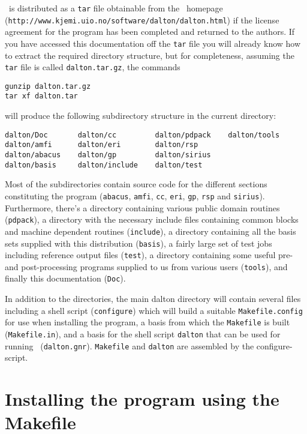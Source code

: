 \dalton\ is distributed as a \verb|tar| file obtainable from
the \dalton\ homepage\\
(\verb|http://www.kjemi.uio.no/software/dalton/dalton.html|) if the
license agreement for the program has been completed and returned to
the authors.  If you have accessed this documentation off the
\verb|tar| file you will
already know how to extract the required directory structure, but
for completeness, assuming the \verb|tar| file is called
\verb|dalton.tar.gz|, the commands
\begin{verbatim}
gunzip dalton.tar.gz
tar xf dalton.tar
\end{verbatim}
will produce the following subdirectory structure in the current
directory:
\begin{verbatim}
dalton/Doc       dalton/cc         dalton/pdpack    dalton/tools
dalton/amfi      dalton/eri        dalton/rsp
dalton/abacus    dalton/gp         dalton/sirius
dalton/basis     dalton/include    dalton/test
\end{verbatim}
Most of the subdirectories contain source code for the different sections
constituting the program (\verb|abacus|, \verb|amfi|, \verb|cc|,
\verb|eri|, \verb|gp|, \verb|rsp| and \verb|sirius|). Furthermore,
there's a directory containing
various public domain routines (\verb|pdpack|), a directory with the
necessary include files containing common blocks and
machine dependent routines (\verb|include|), a directory containing
all the basis sets supplied with this distribution (\verb|basis|), a
fairly large set of test jobs including reference output files
(\verb|test|), a directory containing some useful pre- and
post-processing programs supplied to us from various users
(\verb|tools|), and finally this documentation (\verb|Doc|). 

In addition to the directories, the main dalton directory will
contain several files including a shell script (\verb|configure|)
which will build a suitable \verb|Makefile.config| for use when
installing the program, a basis from which the \verb|Makefile| is built
(\verb|Makefile.in|), and a basis for the shell script \verb|dalton|
that can be used for running \dalton\
(\verb|dalton.gnr|). \verb|Makefile| and \verb|dalton| are assembled
by the configure-script.


\section{Installing the program using the Makefile}\label{sec:Makefile}

